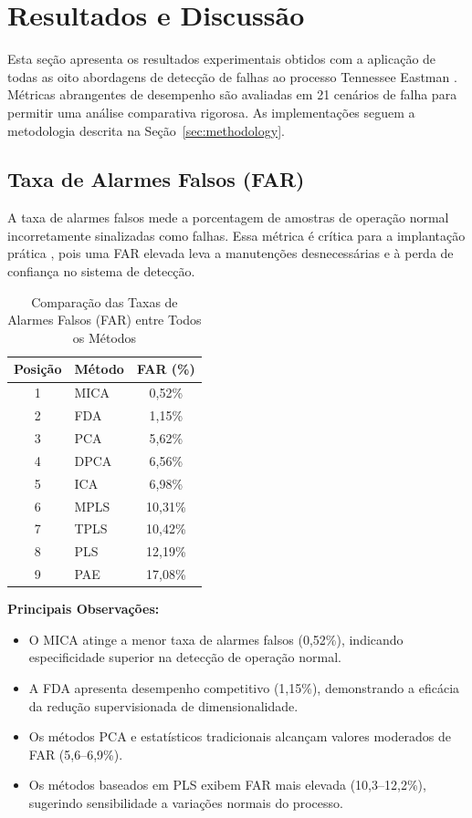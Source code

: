 \documentclass[journal]{IEEEtran}
\begin{document}
\section{Resultados e Discussão}
\label{sec:results}

Esta seção apresenta os resultados experimentais obtidos com a aplicação de todas as oito abordagens de detecção de falhas ao processo Tennessee Eastman \cite{downs_and_vogel_1993, germano2016}. Métricas abrangentes de desempenho são avaliadas em 21 cenários de falha para permitir uma análise comparativa rigorosa. As implementações seguem a metodologia descrita na Seção~\ref{sec:methodology}.

\subsection{Taxa de Alarmes Falsos (FAR)}
\label{subsec:far_results}

A taxa de alarmes falsos mede a porcentagem de amostras de operação normal incorretamente sinalizadas como falhas. Essa métrica é crítica para a implantação prática \cite{yin2012}, pois uma FAR elevada leva a manutenções desnecessárias e à perda de confiança no sistema de detecção.

\begin{table}[H]
\centering
\caption{Comparação das Taxas de Alarmes Falsos (FAR) entre Todos os Métodos}
\label{tab:far_comparison}
\small
\begin{tabular}{clc}
\toprule
\rowcolor{gray!20}
\textbf{Posição} & \textbf{Método} & \textbf{FAR (\%)} \\
\midrule
1 & MICA  & 0,52\% \\
2 & FDA   & 1,15\% \\
3 & PCA   & 5,62\% \\
4 & DPCA  & 6,56\% \\
5 & ICA   & 6,98\% \\
6 & MPLS  & 10,31\% \\
7 & TPLS  & 10,42\% \\
8 & PLS   & 12,19\% \\
9 & PAE   & 17,08\% \\
\bottomrule
\end{tabular}
\end{table}

\textbf{Principais Observações:}
\begin{itemize}
    \item O MICA atinge a menor taxa de alarmes falsos (0,52\%), indicando especificidade superior na detecção de operação normal.
    \item A FDA apresenta desempenho competitivo (1,15\%), demonstrando a eficácia da redução supervisionada de dimensionalidade.
    \item Os métodos PCA e estatísticos tradicionais alcançam valores moderados de FAR (5,6--6,9\%).
    \item Os métodos baseados em PLS exibem FAR mais elevada (10,3--12,2\%), sugerindo sensibilidade a variações normais do processo.
\end{itemize}
\end{document}
